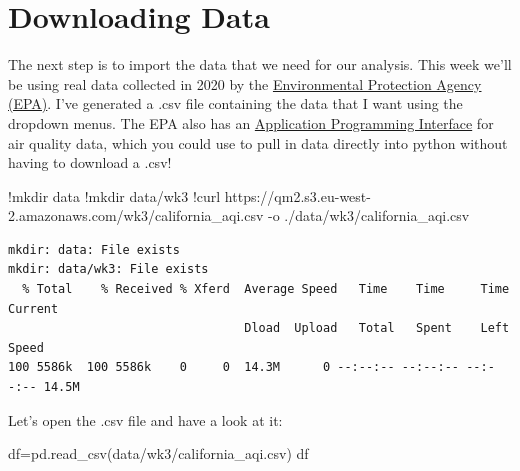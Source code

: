 \documentclass[
  letterpaper,
  DIV=11,
  numbers=noendperiod]{scrreprt}
\newenvironment{Shaded}{\begin{snugshade}}{\end{snugshade}}
\newcommand{\ErrorTok}[1]{\textcolor[rgb]{0.68,0.00,0.00}{#1}}
\newcommand{\FloatTok}[1]{\textcolor[rgb]{0.68,0.00,0.00}{#1}}
\newcommand{\NormalTok}[1]{\textcolor[rgb]{0.00,0.23,0.31}{#1}}
\newcommand{\OperatorTok}[1]{\textcolor[rgb]{0.37,0.37,0.37}{#1}}
\newcommand{\StringTok}[1]{\textcolor[rgb]{0.13,0.47,0.30}{#1}}
\begin{document}
\hypertarget{downloading-data-1}{%
\section{Downloading Data}\label{downloading-data-1}}

The next step is to import the data that we need for our analysis. This
week we'll be using real data collected in 2020 by the
\href{https://www.epa.gov/outdoor-air-quality-data/download-daily-data}{Environmental
Protection Agency (EPA)}. I've generated a .csv file containing the data
that I want using the dropdown menus. The EPA also has an
\href{https://aqs.epa.gov/aqsweb/documents/data_api.html}{Application
Programming Interface} for air quality data, which you could use to pull
in data directly into python without having to download a .csv!

\begin{Shaded}
\begin{Highlighting}[]
\OperatorTok{!}\NormalTok{mkdir data}
\OperatorTok{!}\NormalTok{mkdir data}\OperatorTok{/}\NormalTok{wk3}
\OperatorTok{!}\NormalTok{curl https:}\OperatorTok{//}\NormalTok{qm2.s3.eu}\OperatorTok{{-}}\NormalTok{west}\OperatorTok{{-}}\FloatTok{2.}\ErrorTok{amazonaws}\NormalTok{.com}\OperatorTok{/}\NormalTok{wk3}\OperatorTok{/}\NormalTok{california\_aqi.csv }\OperatorTok{{-}}\NormalTok{o .}\OperatorTok{/}\NormalTok{data}\OperatorTok{/}\NormalTok{wk3}\OperatorTok{/}\NormalTok{california\_aqi.csv}
\end{Highlighting}
\end{Shaded}

\begin{verbatim}
mkdir: data: File exists
mkdir: data/wk3: File exists
  % Total    % Received % Xferd  Average Speed   Time    Time     Time  Current
                                 Dload  Upload   Total   Spent    Left  Speed
100 5586k  100 5586k    0     0  14.3M      0 --:--:-- --:--:-- --:--:-- 14.5M
\end{verbatim}

Let's open the .csv file and have a look at it:

\begin{Shaded}
\begin{Highlighting}[]
\NormalTok{df}\OperatorTok{=}\NormalTok{pd.read\_csv(}\StringTok{\textquotesingle{}data/wk3/california\_aqi.csv\textquotesingle{}}\NormalTok{)}
\NormalTok{df}
\end{Highlighting}
\end{Shaded}
\end{document}
